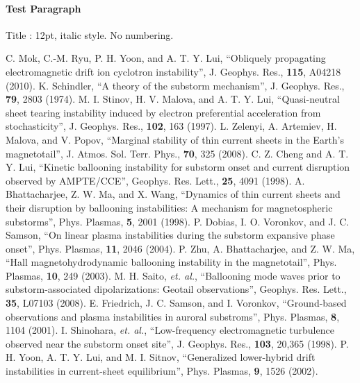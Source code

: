 \documentclass{gshs-report-v1.2}
\begin{document}
\paragraph{Test Paragraph}

Title : 12pt, italic style. No numbering.



\begin{thebibliography}{99}

C. Mok, C.-M. Ryu, P. H. Yoon, and A. T. Y. Lui, ``Obliquely propagating electromagnetic drift ion cyclotron instability'', J. Geophys. Res., {\bf 115}, A04218 (2010).
 K. Schindler, ``A theory of the substorm mechanism'', J. Geophys. Res., {\bf 79}, 2803 (1974).
 M. I. Stinov, H. V. Malova, and A. T. Y. Lui, ``Quasi-neutral sheet tearing instability induced by electron preferential acceleration from stochasticity'', J. Geophys. Res., {\bf 102}, 163 (1997).
 L. Zelenyi, A. Artemiev, H. Malova, and V. Popov, ``Marginal stability of thin current sheets in the Earth's magnetotail'', J. Atmos. Sol. Terr. Phys., {\bf 70}, 325 (2008).
 C. Z. Cheng and A. T. Y. Lui, ``Kinetic ballooning instability for substorm onset and current disruption observed by AMPTE/CCE'', Geophys. Res. Lett., {\bf 25}, 4091 (1998).
 A. Bhattacharjee, Z. W. Ma, and X. Wang, ``Dynamics of thin current sheets and their disruption by ballooning instabilities: A mechanism for magnetospheric substorms'', Phys. Plasmas, {\bf 5}, 2001 (1998).
 P. Dobias, I. O. Voronkov, and J. C. Samson, ``On linear plasma instabilities during the substorm expansive phase onset'', Phys. Plasmas, {\bf 11}, 2046 (2004).
 P. Zhu, A. Bhattacharjee, and Z. W. Ma, ``Hall magnetohydrodynamic ballooning instability in the magnetotail'', Phys. Plasmas, {\bf 10}, 249 (2003).
 M. H. Saito, {\it et. al.}, ``Ballooning mode waves prior to substorm-associated dipolarizations: Geotail observations'', Geophys. Res. Lett., {\bf 35}, L07103 (2008).
 E. Friedrich, J. C. Samson, and I. Voronkov, ``Ground-based observations and plasma instabilities in auroral substroms'', Phys. Plasmas, {\bf 8}, 1104 (2001).
 I. Shinohara, {\it et. al.}, ``Low-frequency electromagnetic turbulence observed near the substorm onset site'', J. Geophys. Res., {\bf 103}, 20,365 (1998).
 P. H. Yoon, A. T. Y. Lui, and M. I. Sitnov, ``Generalized lower-hybrid drift instabilities in current-sheet equilibrium'', Phys. Plasmas, {\bf 9}, 1526 (2002).

\end{thebibliography}
\end{document}
